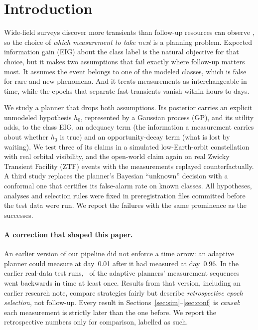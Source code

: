 
\section{Introduction}
Wide-field surveys discover more transients than follow-up resources can observe \citep{Bellm2019,Ivezic2019}, so the choice of \emph{which measurement to take next} is a planning problem. Expected information gain (EIG) about the class label \citep{Lindley1956,Chaloner1995} is the natural objective for that choice, but it makes two assumptions that fail exactly where follow-up matters most. It assumes the event belongs to one of the modeled classes, which is false for rare and new phenomena. And it treats measurements as interchangeable in time, while the epochs that separate fast transients vanish within hours to days.

We study a planner that drops both assumptions. Its posterior carries an explicit unmodeled hypothesis $h_0$, represented by a Gaussian process (GP), and its utility adds, to the class EIG, an adequacy term (the information a measurement carries about whether $h_0$ is true) and an opportunity-decay term (what is lost by waiting). We test three of its claims in a simulated low-Earth-orbit constellation with real orbital visibility, and the open-world claim again on real Zwicky Transient Facility (ZTF) events with the measurements replayed counterfactually. A third study replaces the planner's Bayesian ``unknown'' decision with a conformal one that certifies its false-alarm rate on known classes. All hypotheses, analyses and selection rules were fixed in preregistration files committed before the test data were run. We report the failures with the same prominence as the successes.

\paragraph{A correction that shaped this paper.} An earlier version of our pipeline did not enforce a time arrow: an adaptive planner could measure at day~0.01 after it had measured at day~0.96. In the earlier real-data test runs, \CausalBugPct\ of the adaptive planners' measurement sequences went backwards in time at least once. Results from that version, including an earlier research note, compare strategies fairly but describe \emph{retrospective epoch selection}, not follow-up. Every result in Sections~\ref{sec:sim}--\ref{sec:conf} is \emph{causal}: each measurement is strictly later than the one before. We report the retrospective numbers only for comparison, labelled as such.

